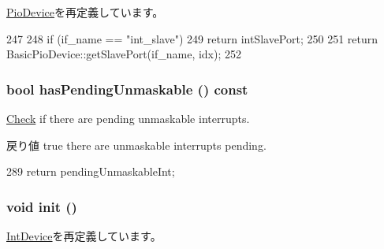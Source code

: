 \hyperlink{classPioDevice_ac918a145092d7514ebc6dbd952dceafb}{PioDevice}を再定義しています。


\begin{DoxyCode}
247     {
248         if (if_name == "int_slave") {
249             return intSlavePort;
250         }
251         return BasicPioDevice::getSlavePort(if_name, idx);
252     }
\end{DoxyCode}
\hypertarget{classX86ISA_1_1Interrupts_a24a3de3c5f8caba5e9aa0d5653a31f63}{
\subsubsection[{hasPendingUnmaskable}]{\setlength{\rightskip}{0pt plus 5cm}bool hasPendingUnmaskable () const}}
\label{classX86ISA_1_1Interrupts_a24a3de3c5f8caba5e9aa0d5653a31f63}
\hyperlink{classCheck}{Check} if there are pending unmaskable interrupts.

\begin{DoxyReturn}{戻り値}
true there are unmaskable interrupts pending. 
\end{DoxyReturn}



\begin{DoxyCode}
289 { return pendingUnmaskableInt; }
\end{DoxyCode}
\hypertarget{classX86ISA_1_1Interrupts_a02fd73d861ef2e4aabb38c0c9ff82947}{
\subsubsection[{init}]{\setlength{\rightskip}{0pt plus 5cm}void init ()}}
\label{classX86ISA_1_1Interrupts_a02fd73d861ef2e4aabb38c0c9ff82947}


\hyperlink{classX86ISA_1_1IntDevice_a02fd73d861ef2e4aabb38c0c9ff82947}{IntDevice}を再定義しています。


